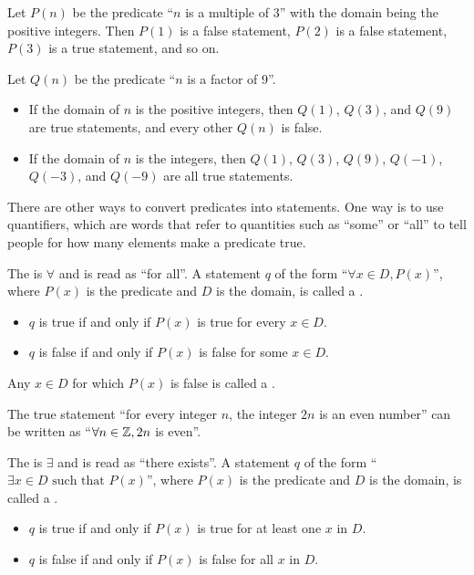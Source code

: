 \begin{example}
    Let $P(n)$ be the predicate ``$n$ is a multiple of 3'' with the domain being the positive integers. Then $P(1)$ is a false statement, $P(2)$ is a false statement, $P(3)$ is a true statement, and so on.
\end{example}

\begin{example}
    Let $Q(n)$ be the predicate ``$n$ is a factor of 9''.
    \begin{itemize}
        \item If the domain of $n$ is the positive integers, then $Q(1)$, $Q(3)$, and $Q(9)$ are true statements, and every other $Q(n)$ is false.
        \item If the domain of $n$ is the integers, then $Q(1)$, $Q(3)$, $Q(9)$, $Q(-1)$, $Q(-3)$, and $Q(-9)$ are all true statements.
    \end{itemize}
\end{example}

There are other ways to convert predicates into statements. One way is to use quantifiers, which are words that refer to quantities such as ``some'' or ``all'' to tell people for how many elements make a predicate true.

\newpage

\begin{definition}
    The  is $\forall$ and is read as ``for all''. A statement $q$ of the form ``$\forall x \in D, P(x)$'', where $P(x)$ is the predicate and $D$ is the domain, is called a .
    \begin{itemize}
        \item $q$ is true if and only if $P(x)$ is true for every $x \in D$.
        \item $q$ is false if and only if $P(x)$ is false for some $x \in D$.
    \end{itemize}
    Any $x \in D$ for which $P(x)$ is false is called a .
\end{definition}

\begin{example}
    The true statement ``for every integer $n$, the integer $2n$ is an even number'' can be written as ``$\forall n \in \mathbb{Z}, 2n$ is even''.
\end{example}

\begin{definition}
    The  is $\exists$ and is read as ``there exists''. A statement $q$ of the form ``$\exists x \in D \textrm{ such that } P(x)$'', where $P(x)$ is the predicate and $D$ is the domain, is called a .
    \begin{itemize}
        \item $q$ is true if and only if $P(x)$ is true for at least one $x$ in $D$.
        \item $q$ is false if and only if $P(x)$ is false for all $x$ in $D$.
    \end{itemize}
\end{definition}

